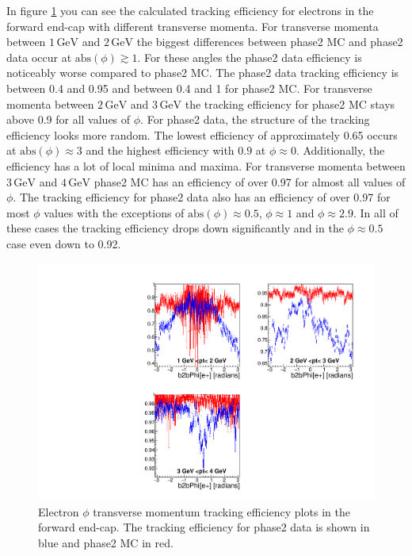 \documentclass[a4paper,11pt,twosided,final,german,openbib,pdftex,listof=totoc,bibliography=totoc]{scrbook}
\begin{document}
In figure \ref{plt:xPtMPhiemFC} you can see the calculated tracking efficiency for electrons in the forward end-cap  with different transverse momenta. 
For transverse momenta between $1\,\textrm{GeV}$ and $2\,\textrm{GeV}$ the biggest differences between phase2 MC and phase2 data occur at $\textrm{abs}(\phi) \gtrsim 1$. For these angles the phase2 data efficiency is noticeably worse compared to phase2 MC. The phase2 data tracking efficiency is between 0.4 and 0.95 and between 0.4 and 1 for phase2 MC. 
For transverse momenta between $2\,\textrm{GeV}$ and $3\,\textrm{GeV}$ the tracking efficiency for phase2 MC stays above 0.9 for all values of $\phi$. For phase2 data, the structure of the tracking efficiency looks more random. The lowest efficiency of approximately 0.65 occurs at $\textrm{abs}(\phi) \approx 3$ and the highest efficiency with $0.9$ at $\phi \approx 0$. Additionally, the efficiency has a lot of local minima and maxima. 
For transverse momenta between $3\,\textrm{GeV}$ and $4\,\textrm{GeV}$ phase2 MC has an efficiency of over 0.97 for almost all values of $\phi$. The tracking efficiency for phase2 data also has an efficiency of over 0.97 for most $\phi$ values with the exceptions of $\textrm{abs}(\phi) \approx 0.5$, $\phi  \approx 1$ and $\phi \approx 2.9$. In all of these cases the tracking efficiency drops down significantly and in the $\phi \approx 0.5$ case even down to 0.92.

\begin{figure}[!htbp]
	\centering
	\includegraphics[width=\textwidth]{Plots/master/xPtMPhiemFC}
	\caption[Transverse Momentum $\phi$ Electron Forward End-Cap Efficiency Phase2]{Electron $\phi$ transverse momentum tracking efficiency plots in the forward end-cap. The tracking efficiency for phase2 data is shown in blue and phase2 MC in red.
		\label{plt:xPtMPhiemFC}}
\end{figure}
\end{document}
